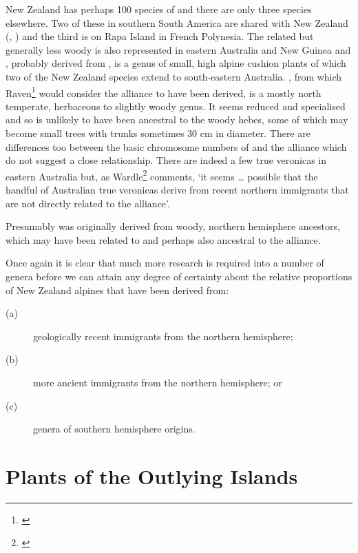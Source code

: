 New Zealand has perhaps 100 species of  and there are only three species elsewhere.
Two of these in southern South America are shared with New Zealand (, ) and the third is  on Rapa Island in French Polynesia.
The related but generally less woody  is also represented in eastern Australia and New Guinea and , probably derived from , is a genus of small, high alpine cushion plants of which two of the New Zealand species extend to south-eastern Australia. , from which Raven\footnote{\cite{raven1973evolution}} would consider the  alliance to have been derived, is a mostly north temperate, herbaceous to slightly woody genus.
It seems reduced and specialised and so is unlikely to have been ancestral to the woody hebes, some of which may become small trees with trunks sometimes 30 cm in diameter.
There are differences too between the basic chromosome numbers of  and the  alliance which do not suggest a close relationship.
There are indeed a few true veronicas in eastern Australia but, as Wardle\footnote{\cite{wardle1978origin}} comments, `it seems … possible that the handful of Australian true veronicas derive from recent northern immigrants that are not directly related to the  alliance'.

Presumably  was originally derived from woody, northern hemisphere ancestors, which may have been related to and perhaps also ancestral to the  alliance.

Once again it is clear that much more research is required into a number of genera before we can attain any degree of certainty about the relative proportions of New Zealand alpines that have been derived from:

\begin{description}
\item[{(a)}]geologically recent immigrants from the northern hemisphere;
\item[{(b)}]more ancient immigrants from the northern hemisphere; or
\item[{(c)}]genera of southern hemisphere origins.
\end{description}

\chapter{Plants of the Outlying Islands}

